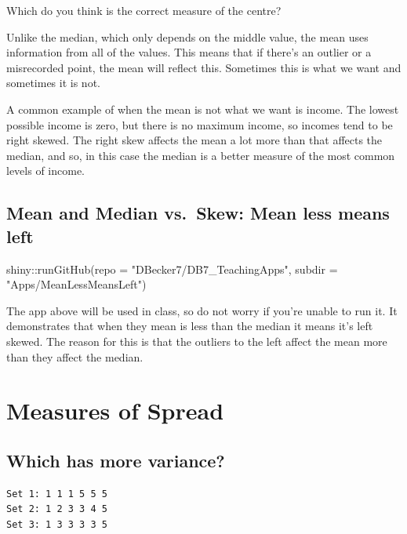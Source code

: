 \documentclass[
  letterpaper,
  DIV=11,
  numbers=noendperiod]{scrreprt}
\newenvironment{Shaded}{\begin{snugshade}}{\end{snugshade}}
\newcommand{\AttributeTok}[1]{\textcolor[rgb]{0.40,0.45,0.13}{#1}}
\newcommand{\FunctionTok}[1]{\textcolor[rgb]{0.28,0.35,0.67}{#1}}
\newcommand{\NormalTok}[1]{\textcolor[rgb]{0.00,0.23,0.31}{#1}}
\newcommand{\SpecialCharTok}[1]{\textcolor[rgb]{0.37,0.37,0.37}{#1}}
\newcommand{\StringTok}[1]{\textcolor[rgb]{0.13,0.47,0.30}{#1}}
\begin{document}
\pspace

Which do you think is the correct measure of the centre?

Unlike the median, which only depends on the middle value, the mean uses
information from all of the values. This means that if there's an
outlier or a misrecorded point, the mean will reflect this. Sometimes
this is what we want and sometimes it is not.

A common example of when the mean is not what we want is income. The
lowest possible income is zero, but there is no maximum income, so
incomes tend to be right skewed. The right skew affects the mean a lot
more than that affects the median, and so, in this case the median is a
better measure of the most common levels of income.

\hypertarget{mean-and-median-vs.-skew-mean-less-means-left}{%
\section{Mean and Median vs.~Skew: Mean less means
left}\label{mean-and-median-vs.-skew-mean-less-means-left}}

\begin{Shaded}
\begin{Highlighting}[]
\NormalTok{shiny}\SpecialCharTok{::}\FunctionTok{runGitHub}\NormalTok{(}\AttributeTok{repo =} \StringTok{"DBecker7/DB7\_TeachingApps"}\NormalTok{, }
    \AttributeTok{subdir =} \StringTok{"Apps/MeanLessMeansLeft"}\NormalTok{)}
\end{Highlighting}
\end{Shaded}

The app above will be used in class, so do not worry if you're unable to
run it. It demonstrates that when they mean is less than the median it
means it's left skewed. The reason for this is that the outliers to the
left affect the mean more than they affect the median.

\hypertarget{measures-of-spread}{%
\chapter{Measures of Spread}\label{measures-of-spread}}

\hypertarget{which-has-more-variance}{%
\section{Which has more variance?}\label{which-has-more-variance}}

\begin{verbatim}
Set 1: 1 1 1 5 5 5
Set 2: 1 2 3 3 4 5
Set 3: 1 3 3 3 3 5
\end{verbatim}
\end{document}
